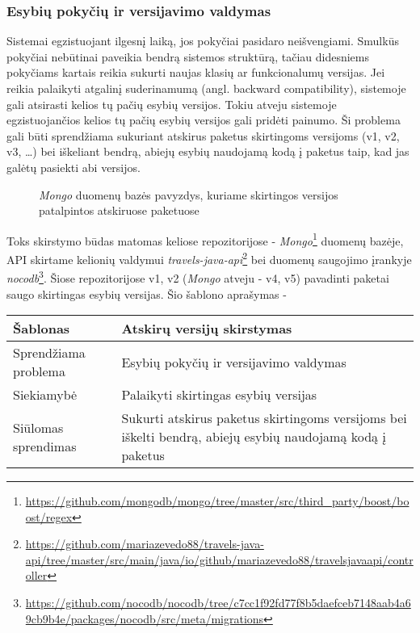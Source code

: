 \subsubsection{Esybių pokyčių ir versijavimo valdymas}
Sistemai egzistuojant ilgesnį laiką, jos pokyčiai pasidaro neišvengiami.
Smulkūs pokyčiai nebūtinai paveikia bendrą sistemos struktūrą, tačiau
didesniems pokyčiams kartais reikia sukurti naujas klasių ar funkcionalumų versijas. Jei reikia palaikyti atgalinį
suderinamumą (angl. backward compatibility), sistemoje gali atsirasti kelios tų pačių esybių versijos.
Tokiu atveju sistemoje egzistuojančios kelios tų pačių esybių versijos gali pridėti painumo.
Ši problema gali būti sprendžiama sukuriant atskirus paketus skirtingoms
versijoms (v1, v2, v3, \ldots) bei iškeliant bendrą, abiejų esybių naudojamą kodą į paketus taip, kad jas galėtų pasiekti abi versijos.
\begin{figure}[H]
    \snugshade
    \endsnugshade
    \caption{\textit{Mongo} duomenų bazės pavyzdys, kuriame skirtingos versijos patalpintos atskiruose paketuose}
\end{figure}
Toks skirstymo būdas matomas keliose repozitorijose - \textit{Mongo}\footnote{\url{https://github.com/mongodb/mongo/tree/master/src/third_party/boost/boost/regex}} duomenų bazėje,
API skirtame kelionių valdymui \textit{travels-java-api}\footnote{\url{https://github.com/mariazevedo88/travels-java-api/tree/master/src/main/java/io/github/mariazevedo88/travelsjavaapi/controller}}
 bei duomenų saugojimo įrankyje \textit{nocodb}\footnote{\url{https://github.com/nocodb/nocodb/tree/c7cc1f92fd77f8b5daefceb7148aab4a69cb9b4e/packages/nocodb/src/meta/migrations}}.
Šiose repozitorijose v1, v2 (\textit{Mongo} atveju - v4, v5) pavadinti paketai saugo skirtingas esybių versijas.
Šio šablono aprašymas -
\begin{center}
    \begin{tabular}{|p{5cm}|p{10cm}|}
        \hline
        Šablonas &  Atskirų versijų skirstymas \\ [0.5ex]
        \hline\hline
        Sprendžiama problema & Esybių pokyčių ir versijavimo valdymas\\
        \hline
        Siekiamybė &  Palaikyti skirtingas esybių versijas \\
        \hline
        Siūlomas sprendimas & Sukurti atskirus paketus skirtingoms versijoms bei iškelti bendrą, abiejų esybių naudojamą kodą į paketus \\
        \hline
    \end{tabular}
\end{center}



